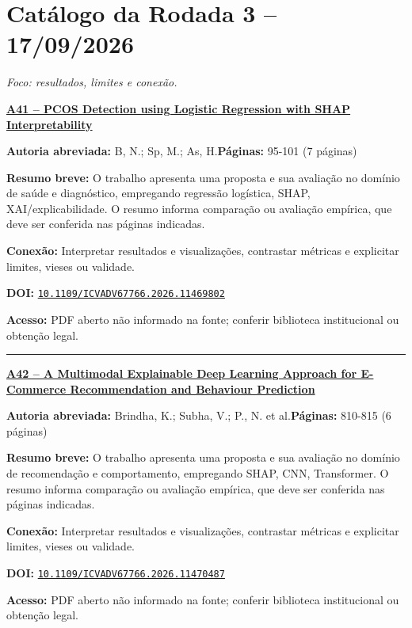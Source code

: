 \documentclass[10pt,a4paper]{article}
\begin{document}
\section*{Catálogo da Rodada 3 -- 17/09/2026}
\textit{Foco: resultados, limites e conexão.}
\par\medskip\noindent
{\large\bfseries\href{https://doi.org/10.1109/ICVADV67766.2026.11469802}{A41 -- PCOS Detection using Logistic Regression with SHAP Interpretability}}\par\smallskip
\textbf{Autoria abreviada:} B, N.; Sp, M.; As, H.\quad \textbf{Páginas:} 95-101 (7 páginas)\par
\textbf{Resumo breve:} O trabalho apresenta uma proposta e sua avaliação no domínio de saúde e diagnóstico, empregando regressão logística, SHAP, XAI/explicabilidade. O resumo informa comparação ou avaliação empírica, que deve ser conferida nas páginas indicadas.\par
\textbf{Conexão:} Interpretar resultados e visualizações, contrastar métricas e explicitar limites, vieses ou validade.\par
\textbf{DOI:} \href{https://doi.org/10.1109/ICVADV67766.2026.11469802}{\nolinkurl{10.1109/ICVADV67766.2026.11469802}}\par
\textbf{Acesso:} PDF aberto não informado na fonte; conferir biblioteca institucional ou obtenção legal.\par
\noindent\rule{\textwidth}{0.35pt}
\par\medskip\noindent
{\large\bfseries\href{https://doi.org/10.1109/ICVADV67766.2026.11470487}{A42 -- A Multimodal Explainable Deep Learning Approach for E-Commerce Recommendation and Behaviour Prediction}}\par\smallskip
\textbf{Autoria abreviada:} Brindha, K.; Subha, V.; P., N. et al.\quad \textbf{Páginas:} 810-815 (6 páginas)\par
\textbf{Resumo breve:} O trabalho apresenta uma proposta e sua avaliação no domínio de recomendação e comportamento, empregando SHAP, CNN, Transformer. O resumo informa comparação ou avaliação empírica, que deve ser conferida nas páginas indicadas.\par
\textbf{Conexão:} Interpretar resultados e visualizações, contrastar métricas e explicitar limites, vieses ou validade.\par
\textbf{DOI:} \href{https://doi.org/10.1109/ICVADV67766.2026.11470487}{\nolinkurl{10.1109/ICVADV67766.2026.11470487}}\par
\textbf{Acesso:} PDF aberto não informado na fonte; conferir biblioteca institucional ou obtenção legal.\par
\end{document}
